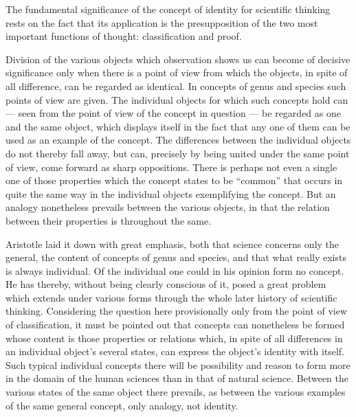 \documentclass[12pt]{article}
\newcommand{\opage}[1]{\marginnote{\footnotesize\textit{[#1]}}}
\begin{document}
The fundamental significance of the concept of identity for scientific
thinking rests on the fact that its application is the presupposition of the
two most important functions of thought: classification and proof.

Division of the various objects which observation shows us can become of
decisive significance only when there is a point of view from which the
objects, in spite of all difference, can be regarded as identical. In
concepts of genus and species such points of view are given. The individual
objects for which such concepts hold can --- seen from the point of view of
the concept in question --- be regarded as one and the same object, which
displays itself in the fact that any one of them can be used as an example
of the concept. The differences between the individual objects do not
thereby fall away, but can, precisely by being united under the same point
of view, come forward as sharp oppositions. There is perhaps not even a
single one of those properties which the concept states to be ``common''
that occurs in \opage{35}quite the same way in the individual objects exemplifying the
concept. But an analogy nonetheless prevails between the various objects, in
that the relation between their properties is throughout the same.

Aristotle laid it down with great emphasis, both that science concerns only
the general, the content of concepts of genus and species, and that what
really exists is always individual. Of the individual one could in his
opinion form no concept. He has thereby, without being clearly conscious of
it, posed a great problem which extends under various forms through the
whole later history of scientific thinking. Considering the question here
provisionally only from the point of view of classification, it must be
pointed out that concepts can nonetheless be formed whose content is those
properties or relations which, in spite of all differences in an individual
object's several states, can express the object's identity with itself. Such
typical individual concepts there will be possibility and reason to form
more in the domain of the human sciences than in that of natural science.
Between the various states of the same object there prevails, as between the
various examples of the same general concept, only analogy, not identity.
\end{document}
